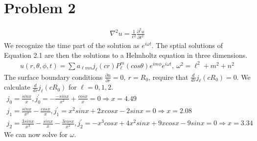 \documentclass[a4paper,10pt]{article}
\numberwithin{equation}{section}
\begin{document}
\section{Problem 2}
\begin{gather}
 \nabla ^2u=\frac{1}{c^2}\frac{\partial ^2u}{\partial t^2}
\end{gather}
We recognize the time part of the solution as $e^{i\omega t}$. 
The sptial solutions of Equation 2.1 are then the solutions to a Helmholtz equation in three dimensions.
\begin{gather}
 u(r, \theta, \phi, t)=\sum a_{\ell mn}j_{\ell}(cr)P_{\ell}^{m}(cos\theta)e^{im\phi}e^{i\omega t},\ \omega^2=\ell^2+m^2+n^2
\end{gather}
The surface boundary conditions $\frac{\partial u}{\partial r}=0,\ r=R_0$, require that $\frac{d}{dr}j_{\ell}(cR_0)=0$.
We calculate $\frac{d}{dr}j_{\ell}(cR_0)$ for $\ell=0,1,2$.
\begin{gather}
 j_0=\frac{sin x}{x}, j_0^{'}=-\frac{-sin x}{x^2}+\frac{cos x}{x}=0\Rightarrow x=4.49\\
 j_1=\frac{sin x}{x^2}-\frac{cosx}{x}, j_1^{'}=x^2sinx+2xcosx-2sinx=0\Rightarrow x=2.08\\
 j_2=\frac{3sinx}{x^3}-\frac{sinx}{x}-\frac{3cosx}{x^2}, j_2^{'}=-x^3cosx+4x^2sinx+9xcosx-9sinx =0 \Rightarrow x=3.34
\end{gather}
We can now solve for $\omega$.
\end{document}
